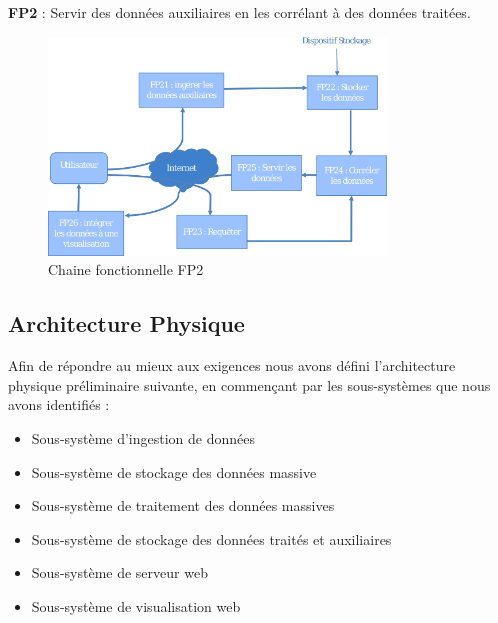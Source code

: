 \documentclass[a4paper]{article}
\begin{document}
\textbf{FP2} : Servir des données auxiliaires en les corrélant à des données traitées.

\begin{figure}[h]
	\centering
	\includegraphics[width=0.8\textwidth]{./tmp/ChaineFonct2.png}
	\caption{Chaine fonctionnelle FP2}
\end{figure}

\newpage
\subsection{Architecture Physique}

Afin de répondre au mieux aux exigences nous avons défini l’architecture physique
préliminaire suivante, en commençant par les sous-systèmes que nous avons identifiés :

\begin{itemize}

	\item Sous-système d’ingestion de données

	\item Sous-système de stockage des données massive

	\item Sous-système de traitement des données massives

	\item Sous-système de stockage des données traités et auxiliaires

	\item Sous-système de serveur web

	\item Sous-système de visualisation web

\end{itemize}
\end{document}
